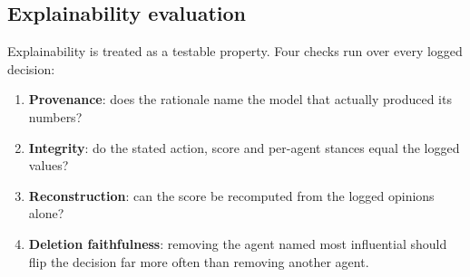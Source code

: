 \documentclass[11pt,a4paper]{article}
\begin{document}
\subsection{Explainability evaluation}
Explainability is treated as a testable property. Four checks run over every logged decision:
\begin{enumerate}
\item \textbf{Provenance}: does the rationale name the model that actually produced its numbers?
\item \textbf{Integrity}: do the stated action, score and per-agent stances equal the logged values?
\item \textbf{Reconstruction}: can the score be recomputed from the logged opinions alone?
\item \textbf{Deletion faithfulness}: removing the agent named most influential should flip the decision far more often than removing another agent.
\end{enumerate}
\end{document}
